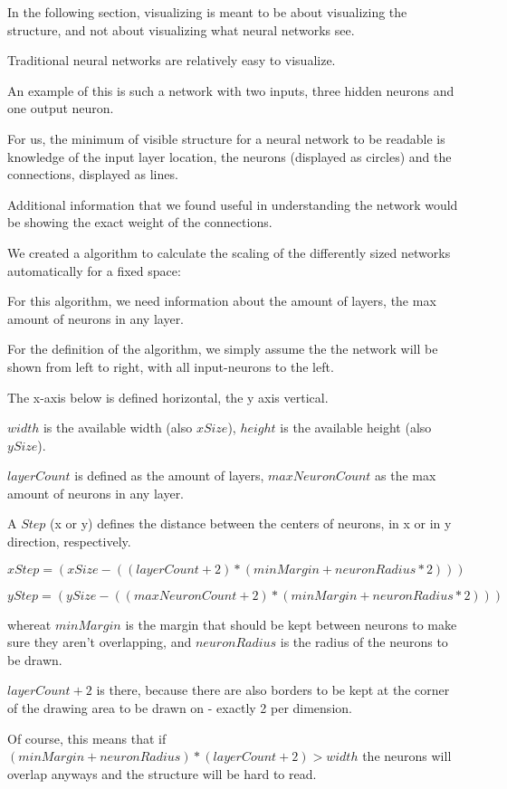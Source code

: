 In the following section, visualizing is meant to be about visualizing the structure, and not about visualizing what neural networks see.\cite{deepnetworkvisualizing2015}

Traditional neural networks are relatively easy to visualize.

An example of this is such a network with two inputs, three hidden neurons and one output neuron.

{\centering
	\begin{neuralnetwork}[height=3, nodespacing=1.5cm]
		\newcommand{\nodelabel}[2]{
			\ifnum#1=0 $x_#2$ \fi
			\ifnum#1=1 $y_#2$ \fi
			\ifnum#1=2 $z_#2$ \fi
		}
		\setdefaultnodetext{\nodelabel}
		\hiddenlayer[count=3, bias=false, title=] \linklayers
		\outputlayer[count=1, title=] \linklayers
	\end{neuralnetwork}
	\par}

For us, the minimum of visible structure for a neural network to be readable is knowledge of the input layer location, the neurons (displayed as circles) and the connections, displayed as lines.

Additional information that we found useful in understanding the network would be showing the exact weight of the connections.

We created a algorithm to calculate the scaling of the differently sized networks automatically for a fixed space:

For this algorithm, we need information about the amount of layers, the max amount of neurons in any layer.

For the definition of the algorithm, we simply assume the the network will be shown from left to right, with all input-neurons to the left.

The x-axis below is defined horizontal, the y axis vertical.

$ width $ is the available width (also $ xSize $), $ height $ is the available height (also $ ySize $).

$ layerCount $ is defined as the amount of layers, $ maxNeuronCount $ as the max amount of neurons in any layer.

A $ Step $ (x or y) defines the distance between the centers of neurons, in x or in y direction, respectively.

$$ xStep = (xSize - ((layerCount + 2) * (minMargin + neuronRadius * 2))) $$

$$ yStep = (ySize - ((maxNeuronCount + 2) * (minMargin + neuronRadius * 2))) $$

 whereat $ minMargin $ is the margin that should be kept between neurons to make sure they aren't overlapping, and $ neuronRadius $ is the radius of the neurons to be drawn.
 
 $ layerCount + 2 $ is there, because there are also borders to be kept at the corner of the drawing area to be drawn on - exactly 2 per dimension.
 
 Of course, this means that if $ (minMargin + neuronRadius) * (layerCount + 2) > width $ the neurons will overlap anyways and the structure will be hard to read.